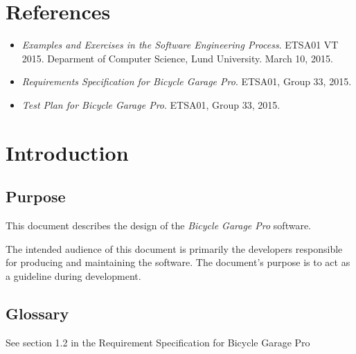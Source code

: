 \documentclass[12pt,titlepage]{article}
\begin{document}


\maketitle
\newpage
\tableofcontents
\thispagestyle{empty}
\setcounter{page}{0}
\newpage


\section{References}
\label{sec:references}

\begin{itemize}
	\item \textit{Examples and Exercises in the Software
		Engineering Process}. ETSA01 VT 2015. Deparment of Computer
		Science, Lund University. March 10, 2015.
	\item \textit{Requirements Specification for Bicycle Garage
		Pro}. ETSA01, Group 33, 2015.
	\item \textit{Test Plan for Bicycle Garage Pro}. ETSA01, Group 33, 2015.
\end{itemize}


\section{Introduction}
\label{sec:introduction}

\subsection{Purpose}
\label{subsec:introduction-purpose}

This document describes the design of the \textit{Bicycle Garage Pro} software.

The intended audience of this document is primarily the developers responsible
for producing and maintaining the software. The document's purpose is to act as
a guideline during development.

\subsection{Glossary}
\label{subsec:introduction-glossary}
See section 1.2 in the Requirement Specification for Bicycle Garage Pro
\end{document}
